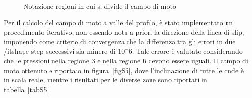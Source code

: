 \begin{figure}[h!]
	\caption{\footnotesize Notazione regioni in cui si divide il campo di moto}
	\label{figS4}
\end{figure}

Per il calcolo del campo di moto a valle del profilo, è stato implementato un procedimento iterativo, non essendo nota a priori la direzione della linea di slip, imponendo come criterio di convergenza che la differenza tra gli errori in due {/itshape step} successivi sia  minore di $10^-6$. Tale errore è valutato considerando che le pressioni nella regione 3 e nella regione 6 devono essere uguali. Il campo di moto ottenuto e riportato in figura~\vref{figS5}, dove l'inclinazione di tutte le onde è in scala reale, mentre i risultati per le diverse zone sono riportati in tabella~\vref{tabS5}

